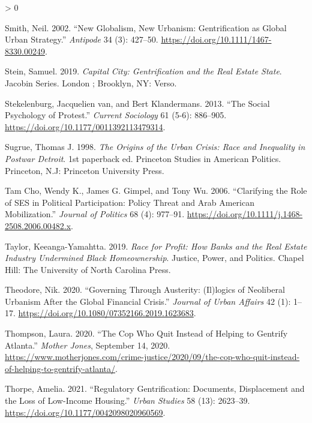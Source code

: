 \documentclass[
  12pt,
]{article}
\newlength{\cslhangindent}
\newenvironment{CSLReferences}[2] %
 {%
  \setlength{\parindent}{0pt}
  \ifodd #1 \everypar{\setlength{\hangindent}{\cslhangindent}}\ignorespaces\fi
  \ifnum #2 > 0
  \setlength{\parskip}{#2\baselineskip}
  \fi
 }%
 {}
\begin{document}
\begin{CSLReferences}{1}{0}
\leavevmode\hypertarget{ref-Smith2002}{}%
Smith, Neil. 2002. {``New {Globalism}, {New Urbanism}: {Gentrification} as {Global Urban Strategy}.''} \emph{Antipode} 34 (3): 427--50. \url{https://doi.org/10.1111/1467-8330.00249}.

\leavevmode\hypertarget{ref-Stein2019}{}%
Stein, Samuel. 2019. \emph{Capital City: Gentrification and the Real Estate State}. Jacobin Series. {London ; Brooklyn, NY}: {Verso}.

\leavevmode\hypertarget{ref-vanStekelenburg2013}{}%
Stekelenburg, Jacquelien van, and Bert Klandermans. 2013. {``The Social Psychology of Protest.''} \emph{Current Sociology} 61 (5-6): 886--905. \url{https://doi.org/10.1177/0011392113479314}.

\leavevmode\hypertarget{ref-Sugrue1998}{}%
Sugrue, Thomas J. 1998. \emph{The Origins of the Urban Crisis: Race and Inequality in Postwar {Detroit}}. 1st paperback ed. Princeton Studies in {American} Politics. {Princeton, N.J}: {Princeton University Press}.

\leavevmode\hypertarget{ref-TamCho2006a}{}%
Tam Cho, Wendy K., James G. Gimpel, and Tony Wu. 2006. {``Clarifying the {Role} of {SES} in {Political Participation}: {Policy Threat} and {Arab American Mobilization}.''} \emph{Journal of Politics} 68 (4): 977--91. \url{https://doi.org/10.1111/j.1468-2508.2006.00482.x}.

\leavevmode\hypertarget{ref-Taylor2019}{}%
Taylor, Keeanga-Yamahtta. 2019. \emph{Race for Profit: How Banks and the Real Estate Industry Undermined Black Homeownership}. Justice, Power, and Politics. {Chapel Hill}: {The University of North Carolina Press}.

\leavevmode\hypertarget{ref-Theodore2020}{}%
Theodore, Nik. 2020. {``Governing Through Austerity: ({Il})logics of Neoliberal Urbanism After the Global Financial Crisis.''} \emph{Journal of Urban Affairs} 42 (1): 1--17. \url{https://doi.org/10.1080/07352166.2019.1623683}.

\leavevmode\hypertarget{ref-Thompson2020}{}%
Thompson, Laura. 2020. {``The Cop Who Quit Instead of Helping to Gentrify {Atlanta}.''} \emph{Mother Jones}, September 14, 2020. \url{https://www.motherjones.com/crime-justice/2020/09/the-cop-who-quit-instead-of-helping-to-gentrify-atlanta/}.

\leavevmode\hypertarget{ref-Thorpe2021}{}%
Thorpe, Amelia. 2021. {``Regulatory Gentrification: {Documents}, Displacement and the Loss of Low-Income Housing.''} \emph{Urban Studies} 58 (13): 2623--39. \url{https://doi.org/10.1177/0042098020960569}.


\end{CSLReferences}
\end{document}
